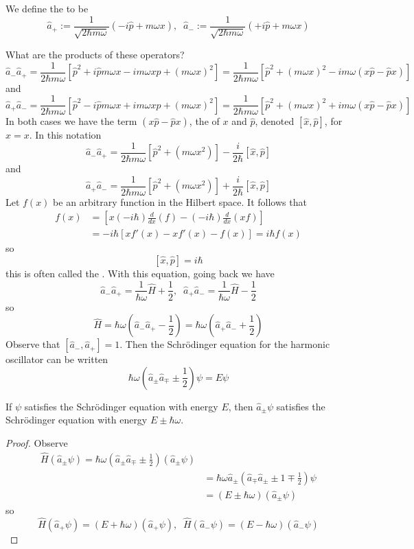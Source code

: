 \documentclass[12pt, a4paper, oneside, openright, titlepage]{book}
\begin{document}
\begin{defn}
    We define the  to be $$\hat{a}_+ := \frac{1}{\sqrt{2\hbar m\omega}}(-i\hat{p} + m\omega x),\;\;\hat{a}_- := \frac{1}{\sqrt{2\hbar m\omega}}(+i\hat{p}+m\omega x)$$
\end{defn}
What are the products of these operators? $$\hat{a}_-\hat{a}_+ = \frac{1}{2\hbar m\omega}\left[\hat{p}^2+i\hat{p}m\omega x - im\omega x\hat{p} + (m\omega x)^2\right] = \frac{1}{2\hbar m\omega}\left[\hat{p}^2+(m\omega x)^2 - im\omega(x\hat{p} - \hat{p}x)\right]$$
and $$\hat{a}_+\hat{a}_- = \frac{1}{2\hbar m\omega}\left[\hat{p}^2-i\hat{p}m\omega x + im\omega x\hat{p} + (m\omega x)^2\right] = \frac{1}{2\hbar m\omega}\left[\hat{p}^2+(m\omega x)^2 + im\omega(x\hat{p} - \hat{p}x)\right]$$
In both cases we have the term $(x\hat{p}-\hat{p}x)$, the  of $x$ and $\hat{p}$, denoted $[\hat{x},\hat{p}]$, for $\hat{x} = x$. In this notation $$\hat{a}_-\hat{a}_+ = \frac{1}{2\hbar m\omega}[\hat{p}^2+(m\omega x^2)] - \frac{i}{2\hbar}[\hat{x},\hat{p}]$$
and $$\hat{a}_+\hat{a}_- = \frac{1}{2\hbar m\omega}[\hat{p}^2+(m\omega x^2)] + \frac{i}{2\hbar}[\hat{x},\hat{p}]$$
Let $f(x)$ be an arbitrary function in the Hilbert space. It follows that \begin{align*}
    [\hat{x},\hat{p}]f(x) &= \left[x(-i\hbar)\frac{d}{dx}(f) - (-i\hbar)\frac{d}{dx}(xf)\right] \\
    &= -i\hbar\left[xf'(x) - xf'(x) - f(x)\right] = i\hbar f(x)
\end{align*}
so $$[\hat{x},\hat{p}] = i\hbar$$
this is often called the . With this equation, going back we have $$\hat{a}_-\hat{a}_+ = \frac{1}{\hbar \omega}\hat{H} + \frac{1}{2},\;\;\hat{a}_+\hat{a}_- = \frac{1}{\hbar \omega}\hat{H} - \frac{1}{2}$$
so $$\hat{H} = \hbar\omega\left(\hat{a}_-\hat{a}_+ - \frac{1}{2}\right) = \hbar \omega\left(\hat{a}_+\hat{a}_- + \frac{1}{2}\right)$$
Observe that $[\hat{a}_-,\hat{a}_+] = 1$. Then the Schr\"{o}dinger equation for the harmonic oscillator can be written $$\hbar \omega \left(\hat{a}_{\pm}\hat{a}_{\mp}\pm\frac{1}{2}\right)\psi = E\psi$$

\begin{prop}
    If $\psi$ satisfies the Schr\"{o}dinger equation with energy $E$, then $\hat{a}_{\pm}\psi$ satisfies the Schr\"{o}dinger equation with energy $E\pm\hbar\omega$.
\end{prop}
\begin{proof}
    Observe \begin{align*}
        \hat{H}(\hat{a}_{\pm}\psi) = \hbar\omega\left(\hat{a}_{\pm}\hat{a}_{\mp} \pm \frac{1}{2}\right)(\hat{a}_{\pm}\psi) \\
        &= \hbar \omega\hat{a}_{\pm}\left(\hat{a}_{\mp}\hat{a}_{\pm} \pm1 \mp\frac{1}{2}\right)\psi \\
        &= \left(E \pm \hbar\omega\right)(\hat{a}_{\pm}\psi)
    \end{align*}
    so $$\hat{H}(\hat{a}_+\psi) = (E + \hbar\omega)(\hat{a}_+\psi),\;\;\hat{H}(\hat{a}_-\psi) = (E-\hbar\omega)(\hat{a}_-\psi)$$
\end{proof}
\end{document}
